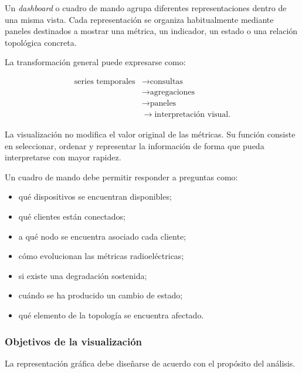 Un \textit{dashboard} o cuadro de mando agrupa diferentes
representaciones dentro de una misma vista. Cada representación se
organiza habitualmente mediante paneles destinados a mostrar una métrica,
un indicador, un estado o una relación topológica concreta.

La transformación general puede expresarse como:

\[
\begin{aligned}
    \text{series temporales}
    &\longrightarrow
    \text{consultas}\\
    &\longrightarrow
    \text{agregaciones}\\
    &\longrightarrow
    \text{paneles}\\
    &\longrightarrow
    \text{interpretación visual}.
\end{aligned}
\]

La visualización no modifica el valor original de las métricas. Su
función consiste en seleccionar, ordenar y representar la información de
forma que pueda interpretarse con mayor rapidez.

Un cuadro de mando debe permitir responder a preguntas como:

\begin{itemize}
    \item qué dispositivos se encuentran disponibles;

    \item qué clientes están conectados;

    \item a qué nodo se encuentra asociado cada cliente;

    \item cómo evolucionan las métricas radioeléctricas;

    \item si existe una degradación sostenida;

    \item cuándo se ha producido un cambio de estado;

    \item qué elemento de la topología se encuentra afectado.
\end{itemize}


\subsubsection*{Objetivos de la visualización}

La representación gráfica debe diseñarse de acuerdo con el propósito del
análisis.

